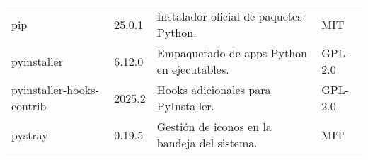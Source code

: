 \begin{longtable}[]{@{}llll@{}}
    \begin{minipage}[t]{0.18\columnwidth}\raggedright\strut pip \strut \end{minipage} & \begin{minipage}[t]{0.10\columnwidth}\raggedright\strut 25.0.1 \strut \end{minipage} & \begin{minipage}[t]{0.49\columnwidth}\raggedright\strut Instalador oficial de paquetes Python. \strut \end{minipage} & \begin{minipage}[t]{0.11\columnwidth}\raggedright\strut MIT \strut \end{minipage} \tabularnewline

    \begin{minipage}[t]{0.18\columnwidth}\raggedright\strut pyinstaller \strut \end{minipage} & \begin{minipage}[t]{0.10\columnwidth}\raggedright\strut 6.12.0 \strut \end{minipage} & \begin{minipage}[t]{0.49\columnwidth}\raggedright\strut Empaquetado de apps Python en ejecutables. \strut \end{minipage} & \begin{minipage}[t]{0.11\columnwidth}\raggedright\strut GPL-2.0 \strut \end{minipage} \tabularnewline

    \begin{minipage}[t]{0.18\columnwidth}\raggedright\strut pyinstaller-hooks-contrib \strut \end{minipage} & \begin{minipage}[t]{0.10\columnwidth}\raggedright\strut 2025.2 \strut \end{minipage} & \begin{minipage}[t]{0.49\columnwidth}\raggedright\strut Hooks adicionales para PyInstaller. \strut \end{minipage} & \begin{minipage}[t]{0.11\columnwidth}\raggedright\strut GPL-2.0 \strut \end{minipage} \tabularnewline

    \begin{minipage}[t]{0.18\columnwidth}\raggedright\strut pystray \strut \end{minipage} & \begin{minipage}[t]{0.10\columnwidth}\raggedright\strut 0.19.5 \strut \end{minipage} & \begin{minipage}[t]{0.49\columnwidth}\raggedright\strut Gestión de iconos en la bandeja del sistema. \strut \end{minipage} & \begin{minipage}[t]{0.11\columnwidth}\raggedright\strut MIT \strut \end{minipage} \tabularnewline


\end{longtable}
